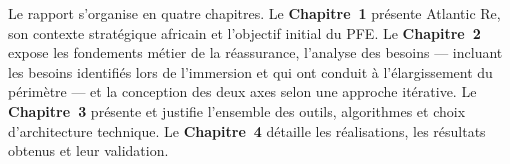 \documentclass[../main.tex]{subfiles}
\begin{document}
Le rapport s'organise en quatre chapitres. Le \textbf{Chapitre~1} présente Atlantic
Re, son contexte stratégique africain et l'objectif initial du PFE. Le
\textbf{Chapitre~2} expose les fondements métier de la réassurance, l'analyse des
besoins --- incluant les besoins identifiés lors de l'immersion et qui ont conduit
à l'élargissement du périmètre --- et la conception des deux axes selon une approche
itérative. Le \textbf{Chapitre~3} présente et justifie l'ensemble des outils,
algorithmes et choix d'architecture technique. Le \textbf{Chapitre~4} détaille les
réalisations, les résultats obtenus et leur validation.

\clearpage

\end{document}
